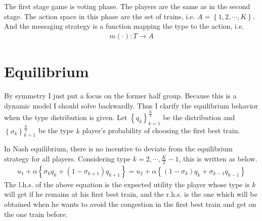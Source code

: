 \documentclass{article}
\begin{document}
The first stage game is voting phase. The players are the same as in the second stage. The action space in this phase are the set of trains, i.e. $A = \left\{ 1,2,\cdots, K \right\}$. And the messaging strategy is a function mapping the type to the action, i.e.
\begin{align*}
	m(\cdot) : T \to A
\end{align*}

\section{Equilibrium}
By symmetry I just put a focus on the former half group. Because this is a dynamic model I should solve backwardly. Thus I clarify the equilibrium behavior when the type distribution is given. Let $\left\{ q_k \right\}_{k = 1}^{\frac{K}{2}}$ be the distribution and $\left\{ \sigma_k \right\}_{k = 1}^{\frac{K}{2}}$ be the type $k$ player's probability of choosing the first best train. 

In Nash equilibrium, there is no incentive to deviate from the equilibrium strategy for all players. Considering type $k = 2, \cdots, \frac{K}{2} -1$, this is written as below.
\begin{align*}
	u_1 + \alpha \left\{ \sigma_k q_k + (1-\sigma_{k+1}) q_{k+1} \right\} = u_2 + \alpha \left\{ (1-\sigma_k) q_k + \sigma_{k-1} q_{k-1} \right\}
\end{align*}
The l.h.s. of the above equation is the expected utility the player whose type is $k$ will get if he remains at his first best train, and the r.h.s. is the one which will be obtained when he wants to avoid the congestion in the first best train and get on the one train before.
\end{document}
